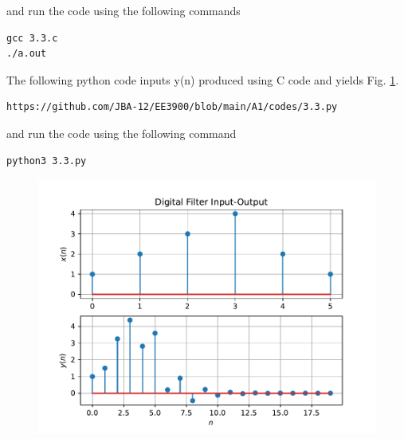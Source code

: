 \documentclass[journal,12pt,twocolumn]{IEEEtran}
\renewcommand\thesection{\arabic{section}}
\begin{document}
\begin{enumerate}[label=\thesection.\arabic*,ref=\thesection.\theenumi]
\begin{lstlisting}
\end{lstlisting}
and run the code using the following commands
\begin{lstlisting}
gcc 3.3.c 
./a.out
\end{lstlisting}
The following python code inputs y(n) produced using C code and yields Fig. \ref{fig:3.3}.
\begin{lstlisting}
https://github.com/JBA-12/EE3900/blob/main/A1/codes/3.3.py
\end{lstlisting}
and run the code using the following command
\begin{lstlisting}
python3 3.3.py
\end{lstlisting}
\begin{figure}[!ht]
\begin{center}
\includegraphics[width=\columnwidth]{./figs/3.3}
\end{center}
\label{fig:3.3}	
\end{figure}
\end{enumerate}
\end{document}

